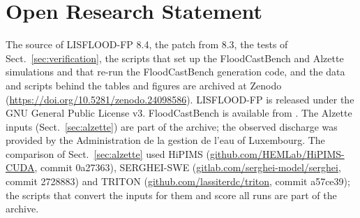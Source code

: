 \documentclass[draft,linenumbers]{agujournal2025}
\begin{document}
\section*{Open Research Statement}
The source of LISFLOOD-FP 8.4, the patch from 8.3, the
tests of Sect.~\ref{sec:verification}, the scripts that set up the
FloodCastBench and Alzette simulations and that re-run the FloodCastBench
generation code, and the data and scripts behind the
tables and figures are archived at Zenodo (\url{https://doi.org/10.5281/zenodo.24098586}). LISFLOOD-FP is
released under the GNU General Public License v3. FloodCastBench is
available from . The Alzette inputs
(Sect.~\ref{sec:alzette}) are part of the archive; the observed discharge was provided by the
Administration de la gestion de l'eau of Luxembourg. The comparison of Sect.~\ref{sec:alzette} used
HiPIMS (\url{github.com/HEMLab/HiPIMS-CUDA}, commit 0a27363), SERGHEI-SWE
(\url{gitlab.com/serghei-model/serghei}, commit 2728883) and TRITON
(\url{github.com/lassiterdc/triton}, commit a57ce39); the scripts that convert the
inputs for them and score all runs are part of the archive.


\end{document}
